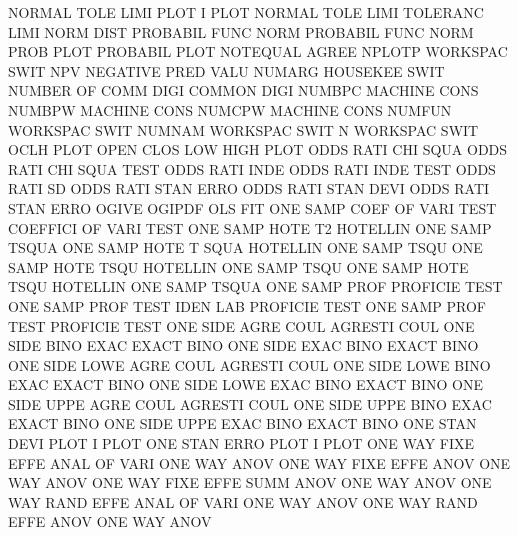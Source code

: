 NORMAL   TOLE LIMI PLOT                 I        PLOT
NORMAL   TOLE LIMI                      TOLERANC LIMI
NORM     DIST                           PROBABIL FUNC
NORM                                    PROBABIL FUNC
NORM     PROB PLOT                      PROBABIL PLOT
NOTEQUAL                                AGREE
NPLOTP                                  WORKSPAC SWIT
NPV                                     NEGATIVE PRED VALU
NUMARG                                  HOUSEKEE SWIT
NUMBER   OF   COMM DIGI                 COMMON   DIGI
NUMBPC                                  MACHINE  CONS
NUMBPW                                  MACHINE  CONS
NUMCPW                                  MACHINE  CONS
NUMFUN                                  WORKSPAC SWIT
NUMNAM                                  WORKSPAC SWIT
N                                       WORKSPAC SWIT
OCLH     PLOT                           OPEN     CLOS LOW  HIGH PLOT
ODDS     RATI CHI  SQUA                 ODDS     RATI CHI  SQUA TEST
ODDS     RATI INDE                      ODDS     RATI INDE TEST
ODDS     RATI SD                        ODDS     RATI STAN ERRO
ODDS     RATI STAN DEVI                 ODDS     RATI STAN ERRO
OGIVE                                   OGIPDF
OLS                                     FIT
ONE      SAMP COEF OF   VARI TEST       COEFFICI OF   VARI TEST
ONE      SAMP HOTE T2                   HOTELLIN ONE  SAMP TSQUA
ONE      SAMP HOTE T    SQUA            HOTELLIN ONE  SAMP TSQU
ONE      SAMP HOTE TSQU                 HOTELLIN ONE  SAMP TSQU
ONE      SAMP HOTE TSQU                 HOTELLIN ONE  SAMP TSQUA
ONE      SAMP PROF                      PROFICIE TEST
ONE      SAMP PROF TEST IDEN LAB        PROFICIE TEST
ONE      SAMP PROF TEST                 PROFICIE TEST
ONE      SIDE AGRE COUL                 AGRESTI  COUL
ONE      SIDE BINO EXAC                 EXACT    BINO
ONE      SIDE EXAC BINO                 EXACT    BINO
ONE      SIDE LOWE AGRE COUL            AGRESTI  COUL
ONE      SIDE LOWE BINO EXAC            EXACT    BINO
ONE      SIDE LOWE EXAC BINO            EXACT    BINO
ONE      SIDE UPPE AGRE COUL            AGRESTI  COUL
ONE      SIDE UPPE BINO EXAC            EXACT    BINO
ONE      SIDE UPPE EXAC BINO            EXACT    BINO
ONE      STAN DEVI PLOT                 I        PLOT
ONE      STAN ERRO PLOT                 I        PLOT
ONE      WAY  FIXE EFFE ANAL OF   VARI  ONE      WAY  ANOV
ONE      WAY  FIXE EFFE ANOV            ONE      WAY  ANOV
ONE      WAY  FIXE EFFE SUMM ANOV       ONE      WAY  ANOV
ONE      WAY  RAND EFFE ANAL OF   VARI  ONE      WAY  ANOV
ONE      WAY  RAND EFFE ANOV            ONE      WAY  ANOV
